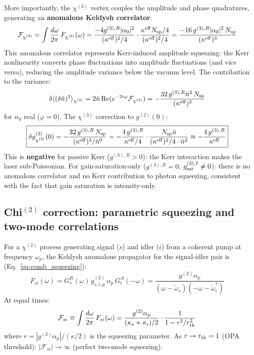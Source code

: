 \documentclass[12pt]{article}
\begin{document}
More importantly, the $\chi^{(3)}$ vertex couples the amplitude and
phase quadratures, generating an \textbf{anomalous Keldysh correlator}:
\begin{equation}
  \mathcal{F}_{\chi^{(3)}} =
  \int\frac{d\omega}{2\pi}\,F_{\chi^{(3)}}(\omega)
  = \frac{-4g^{(3),R}|\alpha_0|^2}{(\kappa^{\rm eff})^2/4}
  \cdot\frac{\kappa^{\rm eff}N_{\rm sp}/4}{(\kappa^{\rm eff})^2/4}
  = \frac{-16\,g^{(3),R}|\alpha_0|^2\,N_{\rm sp}}{(\kappa^{\rm eff})^3}
  \label{eq:F_chi3}
\end{equation}
This anomalous correlator represents Kerr-induced amplitude squeezing:
the Kerr nonlinearity converts phase fluctuations into amplitude fluctuations
(and vice versa), reducing the amplitude variance below the vacuum level.
The contribution to the variance:
\begin{equation}
  \delta\langle(\delta\hat{n})^2\rangle_{\chi^{(3)}} =
  2\bar{n}\,\mathrm{Re}(e^{-2i\varphi}\mathcal{F}_{\chi^{(3)}})
  = -\frac{32\,g^{(3),R}\bar{n}^2\,N_{\rm sp}}{(\kappa^{\rm eff})^3}
  \label{eq:variance_chi3}
\end{equation}
for $\alpha_0$ real ($\varphi=0$).  The $\chi^{(3)}$ correction to $g^{(2)}(0)$:
\begin{equation}
  \boxed{
  \delta g^{(2)}_{\chi^{(3)}}(0) =
  -\frac{32\,g^{(3),R}\,N_{\rm sp}}{(\kappa^{\rm eff})^3/\bar{n}^0}
  = -\frac{4\,g^{(3),R}}{\kappa^{\rm eff}/4}
  \cdot\frac{N_{\rm sp}\bar{n}}{(\kappa^{\rm eff})^2/4\cdot\bar{n}^2}
  \approx -\frac{4\,g^{(3),R}}{\kappa^{\rm eff}}
  }
  \label{eq:g2_chi3}
\end{equation}
This is \textbf{negative} for passive Kerr ($g^{(3),R} > 0$):
the Kerr interaction makes the laser sub-Poissonian.
For gain-saturation-only ($g^{(3),R}=0$, $g^{(3),I}_{\rm sat}\neq 0$):
there is no anomalous correlator and no Kerr contribution to photon
squeezing, consistent with the fact that gain saturation is intensity-only.

\subsection{Chi\texorpdfstring{$^{(2)}$}{(2)} correction:
parametric squeezing and two-mode correlations}
\label{sec:chi2_stats}

For a $\chi^{(2)}$ process generating signal ($s$) and idler ($i$)
from a coherent pump at frequency $\omega_p$, the Keldysh anomalous
propagator for the signal-idler pair is (Eq.~\ref{eq:comb_squeezing}):
\begin{equation}
  F_{si}(\omega) =
  G^R_s(\omega)\,g^{(2)}_{s,i,p}\,\alpha_p\,G^A_i(-\omega)
  = \frac{g^{(2)}\alpha_p}
  {(\omega-\tilde\omega_s)(-\omega-\tilde\omega_i^*)}
  \label{eq:F_OPA}
\end{equation}
At equal times:
\begin{equation}
  \mathcal{F}_{si} \equiv \int\frac{d\omega}{2\pi}\,F_{si}(\omega)
  = \frac{g^{(2)}\alpha_p}{(\kappa_s+\kappa_i)/2}\cdot
  \frac{1}{1-r^2/r_{\rm th}^2}
  \label{eq:F_OPA_equaltime}
\end{equation}
where $r = |g^{(2)}\alpha_p|/(\kappa/2)$ is the squeezing parameter.
As $r\to r_{\rm th}=1$ (OPA threshold): $|\mathcal{F}_{si}|\to\infty$
(perfect two-mode squeezing).
\end{document}
